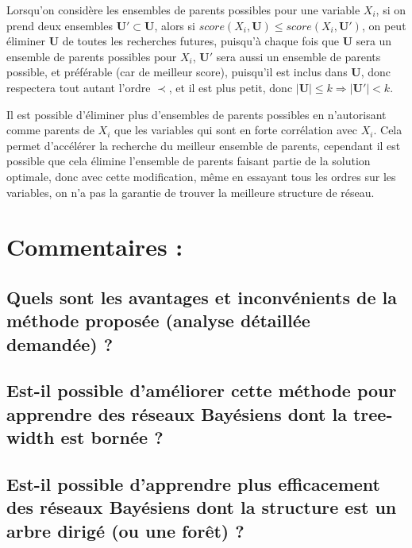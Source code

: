 \documentclass[french,a4paper]{article}
\begin{document}
Lorsqu'on considère les ensembles de parents possibles pour une
variable $X_i$, si on prend deux ensembles $\mathbf{U}' \subset
\mathbf{U}$, alors si $score(X_i, \mathbf{U}) \leq score(X_i,
\mathbf{U'})$, on peut éliminer $\mathbf{U}$ de toutes les recherches
futures, puisqu'à chaque fois que $\mathbf{U}$ sera un ensemble de
parents possibles pour $X_i$, $\mathbf{U}'$ sera aussi un ensemble de
parents possible, et préférable (car de meilleur score), puisqu'il est
inclus dans $\mathbf{U}$, donc respectera tout autant l'ordre $\prec$,
et il est plus petit, donc $|\mathbf{U}| \leq k \Rightarrow
|\mathbf{U}'| < k$.

Il est possible d'éliminer plus d'ensembles de parents possibles en
n'autorisant comme parents de $X_i$ que les variables qui sont en
forte corrélation avec $X_i$. Cela permet d'accélérer la recherche du
meilleur ensemble de parents, cependant il est possible que cela
élimine l'ensemble de parents faisant partie de la solution optimale,
donc avec cette modification, même en essayant tous les ordres sur les
variables, on n'a pas la garantie de trouver la meilleure structure de
réseau.

\section{Commentaires :}
\subsection{Quels sont les avantages et inconvénients de la méthode proposée (analyse détaillée demandée) ?}
\subsection{Est-il possible d'améliorer cette méthode pour apprendre des réseaux Bayésiens dont la tree-width est bornée ?}
\subsection{Est-il possible d'apprendre plus efficacement des réseaux Bayésiens dont la structure est un arbre dirigé (ou une forêt) ?}
\end{document}
